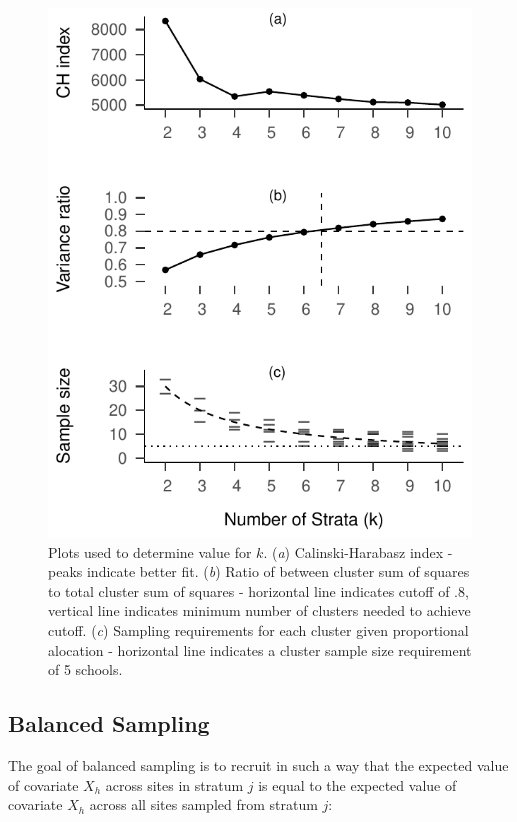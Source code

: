 \documentclass[man,floatsintext]{apa6}
\begin{document}
\begin{figure}
\centering
\includegraphics{GenSamp-Paper_files/figure-latex/fig-k-plots-1.pdf}
\caption{\label{fig:fig-k-plots}Plots used to determine value for \(k\). (\emph{a}) Calinski-Harabasz index - peaks indicate better fit. (\emph{b}) Ratio of between cluster sum of squares to total cluster sum of squares - horizontal line indicates cutoff of .8, vertical line indicates minimum number of clusters needed to achieve cutoff. (\emph{c}) Sampling requirements for each cluster given proportional alocation - horizontal line indicates a cluster sample size requirement of 5 schools.}
\end{figure}

\hypertarget{balanced-sampling}{%
\subsection{Balanced Sampling}\label{balanced-sampling}}

The goal of balanced sampling is to recruit in such a way that the expected value of covariate \(X_h\) across sites in stratum \(j\) is equal to the expected value of covariate \(X_h\) across all sites sampled from stratum \(j\):
\end{document}

